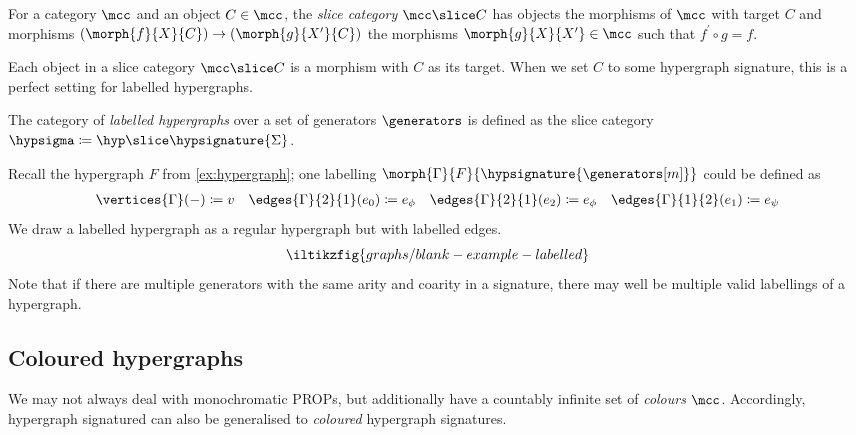 \begin{definition}\label{def:slice-category}
    For a category \(\mcc\) and an object \(C \in \mcc\), the
    \emph{slice category} \(\mcc \slice C\) has objects the morphisms of
    \(\mcc\) with target \(C\) and morphisms
    \((\morph{f}{X}{C}) \to (\morph{g}{X^\prime}{C})\) the morphisms
    \(\morph{g}{X}{X^\prime} \in \mcc\) such that \(f^\prime\circ g = f\).
\end{definition}

Each object in a slice category \(\mcc \slice C\) is a morphism with \(C\) as
its target.
When we set \(C\) to some hypergraph signature, this is a perfect setting for
labelled hypergraphs.

\begin{definition}
    The category of \emph{labelled hypergraphs} over a set
    of generators \(\generators\) is defined as the slice category
    \(\hypsigma \coloneqq \hyp \slice \hypsignature{\Sigma}\).
\end{definition}

\begin{example}\label{ex:labelled-hypergraph}
    Recall the hypergraph \(F\) from \cref{ex:hypergraph}; one labelling
    \(\morph{\Gamma}{F}{\hypsignature{\generators[m]}}\) could be defined as
    \begin{gather*}
        \vertices{\Gamma}(-) \coloneqq v
        \quad
        \edges{\Gamma}{2}{1}(e_0) \coloneqq e_\phi
        \quad
        \edges{\Gamma}{2}{1}(e_2) \coloneqq e_\phi
        \quad
        \edges{\Gamma}{1}{2}(e_1) \coloneqq e_\psi
    \end{gather*}
    We draw a labelled hypergraph as a regular hypergraph but with labelled
    edges.
    \[
        \iltikzfig{graphs/blank-example-labelled}
    \]
    Note that if there are multiple generators with the same arity and coarity
    in a signature, there may well be multiple valid labellings of a hypergraph.
\end{example}

\subsection{Coloured hypergraphs}

We may not always deal with monochromatic PROPs, but additionally have a
countably infinite set of \emph{colours} \(\mcc\).
Accordingly, hypergraph signatured can also be generalised to \emph{coloured}
hypergraph signatures.

